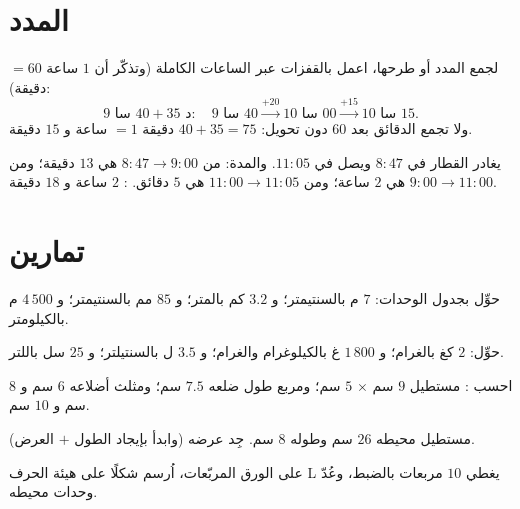 \section{المدد}

\begin{method}\label{met:g4:measure:time}
لجمع المدد أو طرحها، اعمل بالقفزات عبر الساعات الكاملة
(وتذكّر أن $1$ ساعة $= 60$ دقيقة):
\[
9\text{ سا }40 + 35 \text{ د}:
\quad 9\text{ سا }40 \xrightarrow{+20} 10\text{ سا }00
\xrightarrow{+15} 10\text{ سا }15 .
\]
ولا تجمع الدقائق بعد $60$ دون تحويل: $40 + 35 = 75$ دقيقة
$= 1$ ساعة و $15$ دقيقة.
\end{method}

\begin{example}\label{ex:g4:measure:timetable}
يغادر القطار في $8{:}47$ ويصل في $11{:}05$. والمدة:
من $8{:}47 \to 9{:}00$ هي $13$ دقيقة؛ ومن $9{:}00 \to 11{:}00$
هي $2$ ساعة؛ ومن $11{:}00 \to 11{:}05$ هي $5$ دقائق. : $2$ ساعة و $18$ دقيقة.
\end{example}

\section{تمارين}

\begin{exercise}[$\star$]\label{exo:g4:measure:1}
حوِّل بجدول الوحدات: $7$ م بالسنتيمتر؛ و $3.2$ كم بالمتر؛
و $85$ مم بالسنتيمتر؛ و $4\,500$ م بالكيلومتر.
\end{exercise}

\begin{exercise}[$\star$]\label{exo:g4:measure:2}
حوِّل: $2$ كغ بالغرام؛ و $1\,800$ غ بالكيلوغرام والغرام؛
و $3.5$ ل بالسنتيلتر؛ و $25$ سل باللتر.
\end{exercise}

\begin{exercise}[$\star$]\label{exo:g4:measure:3}
احسب : مستطيل $9$ سم $\times$ $5$ سم؛ ومربع
طول ضلعه $7.5$ سم؛ ومثلث أضلاعه $6$ سم و $8$ سم و $10$ سم.
\end{exercise}

\begin{exercise}[$\star$]\label{exo:g4:measure:4}
مستطيل محيطه $26$ سم وطوله $8$ سم. جِد عرضه
(وابدأ بإيجاد الطول $+$ العرض).
\end{exercise}

\begin{exercise}[$\star$]\label{exo:g4:measure:5}
على الورق المربّعات، اُرسم شكلًا على هيئة الحرف L يغطي $10$
مربعات بالضبط، وعُدّ وحدات محيطه.
\end{exercise}


